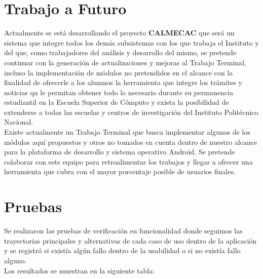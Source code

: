 %
%
%
%


\section{Trabajo a Futuro}

Actualmente se está desarrollando el proyecto \textbf{CALMECAC} que será un sistema que integre todos los demás subsistemas con los que trabaja el Instituto y del que, como trabajadores del análisis y desarrollo del mismo, se pretende continuar con la generación de actualizaciones y mejoras al Trabajo Terminal, incluso la implementación de módulos no pretendidos en el alcance con la finalidad de ofrecerle a los alumnos la herramienta que integre los trámites y noticias qu le permitan obtener todo lo necesario durante su permanencia estudiantil en la Escuela Superior de Cómputo y exista la posibilidad de extenderse a todas las escuelas y centros de investigación del Instituto Politécnico Nacional. \\

Existe actualmente un Trabajo Terminal que busca implementar algunos de los módulos aquí propuestos y otros no tomados en cuenta dentro de nuestro alcance para la plataforma de desarrollo y sistema operativo Android. Se pretende colaborar con este equipo para retroalimentar los trabajos y llegar a ofrecer una herramienta que cubra con el mayor porcentaje posible de usuarios finales. \\

\section{Pruebas}

Se realizaron las pruebas de verificación en funcionalidad donde seguimos las trayectorias principales y alternativas de cada caso de uso dentro de la aplicación y se registró si existía algún fallo dentro de la usabilidad o si no existía fallo alguno. \\
Los resultados se muestran en la siguiente tabla: \\ \\

